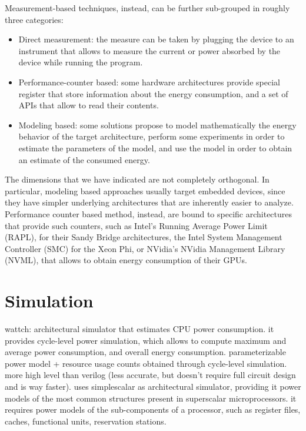Measurement-based techniques, instead, can be further sub-grouped in roughly three categories:
\begin{itemize}
\item Direct measurement: the measure can be taken by plugging the device to an instrument that allows to measure the current or power absorbed by the device while running the program.
\item Performance-counter based: some hardware architectures provide special register that store information about the energy consumption, and a set of APIs that allow to read their contents.
\item Modeling based: some solutions propose to model mathematically the energy behavior of the target architecture, perform some experiments in order to estimate the parameters of the model, and use the model in order to obtain an estimate of the consumed energy.
\end{itemize} 
\par The dimensions that we have indicated are not completely orthogonal. In particular, modeling based approaches usually target embedded devices, since they have simpler underlying architectures that are inherently easier to analyze. \newline Performance counter based method, instead, are bound to specific architectures that provide such counters, such as Intel's Running Average Power Limit (RAPL), for their Sandy Bridge architectures, the Intel System Management Controller (SMC) for the Xeon Phi, or NVidia's NVidia Management Library (NVML), that allows to obtain energy consumption of their GPUs.

\section{Simulation}

wattch: architectural simulator that estimates CPU power consumption.
it provides cycle-level power simulation, which allows to compute maximum and average power consumption, and overall energy consumption.
parameterizable power model + resource usage counts obtained through cycle-level simulation. more high level than verilog (less accurate, but doesn't require full circuit design and is way faster). uses simplescalar as architectural simulator, providing it power models of the most common structures present in superscalar microprocessors.
it requires power models of the sub-components of a processor, such as register files, caches, functional units, reservation stations. \\[1in]


